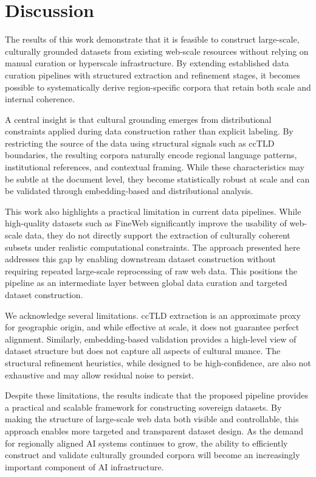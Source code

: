 \documentclass[11pt, a4paper]{article}
\begin{document}
\section{Discussion}

The results of this work demonstrate that it is feasible to construct large-scale, culturally grounded datasets from existing web-scale resources without relying on manual curation or hyperscale infrastructure. By extending established data curation pipelines with structured extraction and refinement stages, it becomes possible to systematically derive region-specific corpora that retain both scale and internal coherence.

A central insight is that cultural grounding emerges from distributional constraints applied during data construction rather than explicit labeling. By restricting the source of the data using structural signals such as ccTLD boundaries, the resulting corpora naturally encode regional language patterns, institutional references, and contextual framing. While these characteristics may be subtle at the document level, they become statistically robust at scale and can be validated through embedding-based and distributional analysis.

This work also highlights a practical limitation in current data pipelines. While high-quality datasets such as FineWeb significantly improve the usability of web-scale data, they do not directly support the extraction of culturally coherent subsets under realistic computational constraints. The approach presented here addresses this gap by enabling downstream dataset construction without requiring repeated large-scale reprocessing of raw web data. This positions the pipeline as an intermediate layer between global data curation and targeted dataset construction.

We acknowledge several limitations. ccTLD extraction is an approximate proxy for geographic origin, and while effective at scale, it does not guarantee perfect alignment. Similarly, embedding-based validation provides a high-level view of dataset structure but does not capture all aspects of cultural nuance. The structural refinement heuristics, while designed to be high-confidence, are also not exhaustive and may allow residual noise to persist.

Despite these limitations, the results indicate that the proposed pipeline provides a practical and scalable framework for constructing sovereign datasets. By making the structure of large-scale web data both visible and controllable, this approach enables more targeted and transparent dataset design. As the demand for regionally aligned AI systems continues to grow, the ability to efficiently construct and validate culturally grounded corpora will become an increasingly important component of AI infrastructure.
\end{document}
